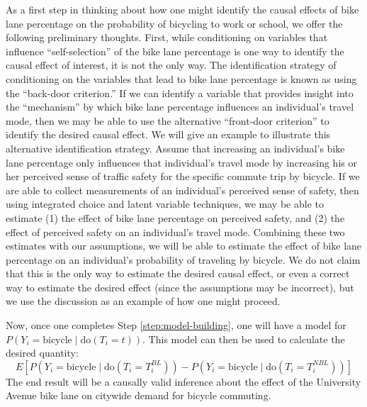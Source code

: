As a first step in thinking about how one might identify the causal effects of bike lane percentage on the probability of bicycling to work or school, we offer the following preliminary thoughts. First, while conditioning on variables that influence ``self-selection'' of the bike lane percentage is one way to identify the causal effect of interest, it is not the only way. The identification strategy of conditioning on the variables that lead to bike lane percentage is known as using the ``back-door criterion.'' If we can identify a variable that provides insight into the ``mechanism'' by which bike lane percentage influences an individual's travel mode, then we may be able to use the alternative ``front-door criterion'' \citep{elwert_2013_graphical, knight_2013_causal} to identify the desired causal effect. We will give an example to illustrate this alternative identification strategy. Assume that increasing an individual's bike lane percentage only influences that individual's travel mode by increasing his or her perceived sense of traffic safety for the specific commute trip by bicycle. If we are able to collect measurements of an individual's perceived sense of safety, then using integrated choice and latent variable techniques, we may be able to estimate (1) the effect of bike lane percentage on perceived safety, and (2) the effect of perceived safety on an individual's travel mode. Combining these two estimates with our assumptions, we will be able to estimate the effect of bike lane percentage on an individual's probability of traveling by bicycle. We do not claim that this is the only way to estimate the desired causal effect, or even a correct way to estimate the desired effect (since the assumptions may be incorrect), but we use the discussion as an example of how one might proceed.


Now, once one completes Step \ref{step:model-building}, one will have a model for $P \left( Y_i = \textrm{bicycle} \mid \textrm{do} \left( T_i = t \right) \right)$. This model can then be used to calculate the desired quantity:
$$E \left[ P \left( Y_i = \textrm{bicycle} \mid \textrm{do} \left( T_i = T_i ^{BL} \right) \right) - P \left( Y_i = \textrm{bicycle} \mid \textrm{do} \left( T_i = T_i ^{NBL} \right) \right) \right]$$ The end result will be a causally valid inference about the effect of the University Avenue bike lane on citywide demand for bicycle commuting.

